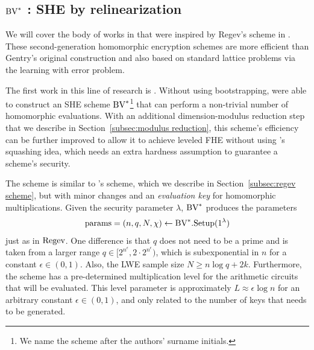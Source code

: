 \documentclass[../main.tex]{subfiles}
\begin{document}
\fi

\subsection{\texorpdfstring{$\text{BV}^*$}{BV*} : SHE by relinearization}

We will cover the body of works in \cite{brakerski2014efficient,brakerski2014leveled,brakerski2012fully,fan2012somewhat} that were inspired by Regev's scheme in \cite{regev2009lattices}. These second-generation homomorphic encryption schemes are more efficient than Gentry's original construction and also based on standard lattice problems via the learning with error problem.   

The first work in this line of research is \cite{brakerski2014efficient}. 
Without using bootstrapping, \cite{brakerski2014efficient} were able to construct an SHE scheme $\text{BV}^*$\footnote{We name the scheme after the authors' surname initials.} that can perform a non-trivial number of homomorphic evaluations. With an additional dimension-modulus reduction step that we describe in Section~\ref{subsec:modulus reduction}, this scheme's efficiency can be further improved to allow it to achieve leveled FHE without using \cite{gentry2010computing}'s squashing idea, which needs an extra hardness assumption to guarantee a scheme's security. 

The scheme is similar to \cite{regev2009lattices}'s scheme, which we describe in Section~\ref{subsec:regev scheme}, but with minor changes and an \textit{evaluation key} for homomorphic multiplications. 
Given the security parameter $\lambda$,
$\text{BV}^*$ produces the parameters 
\begin{align*}
    \text{params}=(n,q,N,\chi) \leftarrow \text{BV}^*.\text{Setup}(1^{\lambda})
\end{align*}
just as in $\text{Regev}$. One difference is that $q$ does not need to be a prime and is taken from a larger range $q \in [2^{n^{\epsilon}},2 \cdot 2^{n^{\epsilon}})$, which is subexponential in $n$ for a constant $\epsilon \in (0,1)$. Also, the LWE sample size $N \ge n \log q+2k$. Furthermore, the scheme has a pre-determined multiplication level for the arithmetic circuits that will be evaluated. This level parameter is approximately $L\approx \epsilon \log n$ for an arbitrary constant $\epsilon \in (0,1)$, and only related to the number of keys that needs to be generated. %
\end{document}
